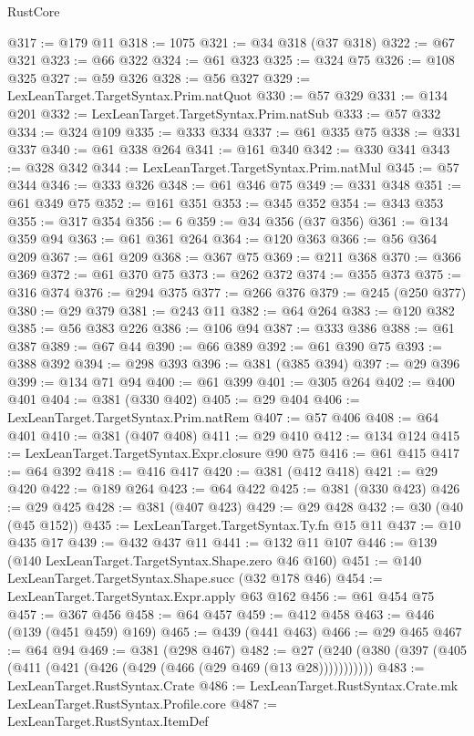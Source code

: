 \begin{lexlean}{RustCore}
\begin{coremodule}
@317 := @179 @11
@318 := 1075
@321 := @34 @318 (@37 @318)
@322 := @67 @321
@323 := @66 @322
@324 := @61 @323
@325 := @324 @75
@326 := @108 @325
@327 := @59 @326
@328 := @56 @327
@329 := LexLeanTarget.TargetSyntax.Prim.natQuot
@330 := @57 @329
@331 := @134 @201
@332 := LexLeanTarget.TargetSyntax.Prim.natSub
@333 := @57 @332
@334 := @324 @109
@335 := @333 @334
@337 := @61 @335 @75
@338 := @331 @337
@340 := @61 @338 @264
@341 := @161 @340
@342 := @330 @341
@343 := @328 @342
@344 := LexLeanTarget.TargetSyntax.Prim.natMul
@345 := @57 @344
@346 := @333 @326
@348 := @61 @346 @75
@349 := @331 @348
@351 := @61 @349 @75
@352 := @161 @351
@353 := @345 @352
@354 := @343 @353
@355 := @317 @354
@356 := 6
@359 := @34 @356 (@37 @356)
@361 := @134 @359 @94
@363 := @61 @361 @264
@364 := @120 @363
@366 := @56 @364 @209
@367 := @61 @209
@368 := @367 @75
@369 := @211 @368
@370 := @366 @369
@372 := @61 @370 @75
@373 := @262 @372
@374 := @355 @373
@375 := @316 @374
@376 := @294 @375
@377 := @266 @376
@379 := @245 (@250 @377)
@380 := @29 @379
@381 := @243 @11
@382 := @64 @264
@383 := @120 @382
@385 := @56 @383 @226
@386 := @106 @94
@387 := @333 @386
@388 := @61 @387
@389 := @67 @44
@390 := @66 @389
@392 := @61 @390 @75
@393 := @388 @392
@394 := @298 @393
@396 := @381 (@385 @394)
@397 := @29 @396
@399 := @134 @71 @94
@400 := @61 @399
@401 := @305 @264
@402 := @400 @401
@404 := @381 (@330 @402)
@405 := @29 @404
@406 := LexLeanTarget.TargetSyntax.Prim.natRem
@407 := @57 @406
@408 := @64 @401
@410 := @381 (@407 @408)
@411 := @29 @410
@412 := @134 @124
@415 := LexLeanTarget.TargetSyntax.Expr.closure @90 @75
@416 := @61 @415
@417 := @64 @392
@418 := @416 @417
@420 := @381 (@412 @418)
@421 := @29 @420
@422 := @189 @264
@423 := @64 @422
@425 := @381 (@330 @423)
@426 := @29 @425
@428 := @381 (@407 @423)
@429 := @29 @428
@432 := @30 (@40 (@45 @152))
@435 := LexLeanTarget.TargetSyntax.Ty.fn @15 @11
@437 := @10 @435 @17
@439 := @432 @437 @11
@441 := @132 @11 @107
@446 := @139 (@140 LexLeanTarget.TargetSyntax.Shape.zero @46 @160)
@451 := @140 LexLeanTarget.TargetSyntax.Shape.succ (@32 @178 @46)
@454 := LexLeanTarget.TargetSyntax.Expr.apply @63 @162
@456 := @61 @454 @75
@457 := @367 @456
@458 := @64 @457
@459 := @412 @458
@463 := @446 (@139 (@451 @459) @169)
@465 := @439 (@441 @463)
@466 := @29 @465
@467 := @64 @94
@469 := @381 (@298 @467)
@482 := @27 (@240 (@380 (@397 (@405 (@411 (@421 (@426 (@429 (@466 (@29 @469 (@13 @28)))))))))))
@483 := LexLeanTarget.RustSyntax.Crate
@486 := LexLeanTarget.RustSyntax.Crate.mk LexLeanTarget.RustSyntax.Profile.core
@487 := LexLeanTarget.RustSyntax.ItemDef

\end{coremodule}
\end{lexlean}
